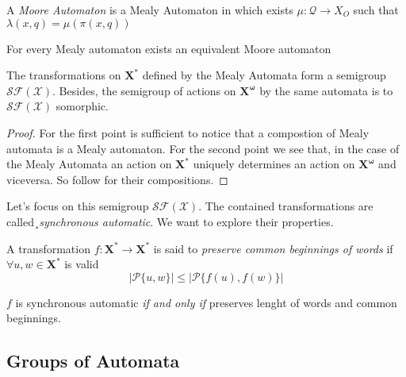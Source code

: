 \documentclass[mat1]{fmfdeloTS}
\newcommand{\fslovar}{\mathbf{X^*}}
\newcommand{\infslovar}{\mathbf{X^\omega}}
\newcommand{\QQ}{\mathcal{Q}}
\begin{document}
\begin{definition}
A \textit{Moore Automaton} is a Mealy Automaton in which exists $\mu:\QQ\longrightarrow X_O$ such that $\lambda(x,q)=\mu(\pi(x,q))$
\end{definition}
\begin{proposition}
For every Mealy automaton exists an equivalent Moore automaton
\end{proposition}

\begin{proposition}
The transformations on $\fslovar$ defined by the Mealy Automata form a semigroup $\mathcal{SF(X)}$. Besides, the semigroup of actions on $\infslovar$ by the same automata is to $\mathcal{SF(X)}$ somorphic.
\end{proposition}
\begin{proof}
For the first point is sufficient to notice that a compostion of Mealy automata is a Mealy automaton. For the second point we see that, in the case of the Mealy Automata an action on $\fslovar$ uniquely determines an action on $\infslovar$ and viceversa. So follow for their compositions.
\end{proof}

Let's focus on this semigroup $\mathcal{SF(X)}$. The contained transformations are called¸\textit{synchronous automatic}. We want to explore their properties.
\begin{definition}
A transformation $f:\fslovar\longrightarrow\fslovar$ is said to \textit{preserve common beginnings of words} if $\forall u,w\in\fslovar$ is valid$$|\mathcal{P}\{u,w\}|\leq|\mathcal{P}\{f(u),f(w)\}|$$
\end{definition}
\begin{proposition}
$f$ is synchronous automatic \textit{if and only if} preserves lenght of words and common beginnings.
\end{proposition}







\subsection{Groups of Automata}
\end{document}

